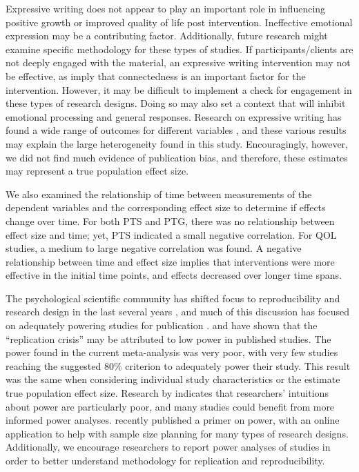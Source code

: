 \documentclass[english,man]{apa6}
\theoremstyle{definition}
\theoremstyle{definition}
\theoremstyle{definition}
\theoremstyle{remark}
\begin{document}
Expressive writing does not appear to play an important role in
influencing positive growth or improved quality of life post
intervention. Ineffective emotional expression may be a contributing
factor. Additionally, future research might examine specific methodology
for these types of studies. If participants/clients are not deeply
engaged with the material, an expressive writing intervention may not be
effective, as \textcite{Pennebaker2001} imply that connectedness is an
important factor for the intervention. However, it may be difficult to
implement a check for engagement in these types of research designs.
Doing so may also set a context that will inhibit emotional processing
and general responses. Research on expressive writing has found a wide
range of outcomes for different variables \autocite{Frattaroli2006}, and
these various results may explain the large heterogeneity found in this
study. Encouragingly, however, we did not find much evidence of
publication bias, and therefore, these estimates may represent a true
population effect size.

We also examined the relationship of time between measurements of the
dependent variables and the corresponding effect size to determine if
effects change over time. For both PTS and PTG, there was no
relationship between effect size and time; yet, PTS indicated a small
negative correlation. For QOL studies, a medium to large negative
correlation was found. A negative relationship between time and effect
size implies that interventions were more effective in the initial time
points, and effects decreased over longer time spans.

The psychological scientific community has shifted focus to
reproducibility and research design in the last several years
\autocite{Nelson2018}, and much of this discussion has focused on
adequately powering studies for publication
\autocites{Bakker2016}{Maxwell2015}. \textcite{Maxwell2015} and
\textcite{OpenScienceCollaboration2015} have shown that the
\enquote{replication crisis} may be attributed to low power in published
studies. The power found in the current meta-analysis was very poor,
with very few studies reaching the suggested 80\% criterion to
adequately power their study. This result was the same when considering
individual study characteristics or the estimate true population effect
size. Research by \textcite{Bakker2016} indicates that researchers'
intuitions about power are particularly poor, and many studies could
benefit from more informed power analyses. \textcite{Anderson2017a}
recently published a primer on power, with an online application to help
with sample size planning for many types of research designs.
Additionally, we encourage researchers to report power analyses of
studies in order to better understand methodology for replication and
reproducibility.
\end{document}
